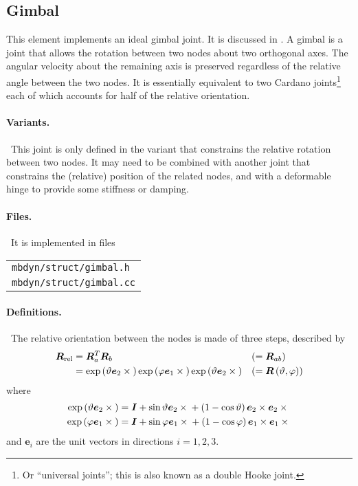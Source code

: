 \documentclass[10pt,fleqn,subeqn]{report}
\newcommand{\T}[1]{\bm{#1}}
\begin{document}
\subsection{Gimbal}
\label{sec:GimbalRotationJoint}
This element implements an ideal gimbal joint.
It is discussed in \cite{GIMBAL-2008}.
A gimbal is a joint that allows the rotation between two nodes
about two orthogonal axes.
The angular velocity about the remaining axis is preserved regardless
of the relative angle between the two nodes.
It is essentially equivalent to two Cardano joints\footnote{Or
``universal joints''; this is also known as a double Hooke joint.}
each of which accounts for half of the relative orientation.

\paragraph{Variants.} \
This joint is only defined in the variant that constrains the relative
rotation between two nodes.
It may need to be combined with another joint that constrains
the (relative) position of the related nodes,
and with a deformable hinge to provide some stiffness or damping.

\paragraph{Files.} \
It is implemented in files

\begin{tabular}{l}
\texttt{mbdyn/struct/gimbal.h} \\
\texttt{mbdyn/struct/gimbal.cc}
\end{tabular}

\paragraph{Definitions.} \
The relative orientation between the nodes is made of three steps,
described by
\begin{subequations}
\begin{align}
	\T{R}_{\text{rel}}
	&= \T{R}_a^T \T{R}_b & & ( = \T{R}_{ab} )
	\label{eq:gimbal:R_a_b} \\
	&= \llk{exp}\plbr{\vartheta \T{e}_2 \times{}}
		\llk{exp}\plbr{\varphi \T{e}_1 \times{}}
		\llk{exp}\plbr{\vartheta \T{e}_2 \times{}}
	& & ( = \T{R}\plbr{\vartheta, \varphi} )
	\label{eq:gimbal:R_theta_phi}
\end{align}
\end{subequations}
where
\begin{subequations}
\begin{align}
	\llk{exp}\plbr{\vartheta \T{e}_2 \times{}} &=
		\T{I} + \sin\vartheta \T{e}_2\times{}
			+ \plbr{1 - \cos\vartheta}\T{e}_2\times\T{e}_2\times{}
		\label{eq:GIMBAL-EXP-THETA} \\
	\llk{exp}\plbr{\varphi \T{e}_1 \times{}} &=
		\T{I} + \sin\varphi \T{e}_1\times{}
			+ \plbr{1 - \cos\varphi}\T{e}_1\times\T{e}_1\times{}
		\label{eq:GIMBAL-EXP-PHI}
\end{align}
\end{subequations}
and $\T{e}_i$ are the unit vectors in directions $i=1,2,3$.
\end{document}
